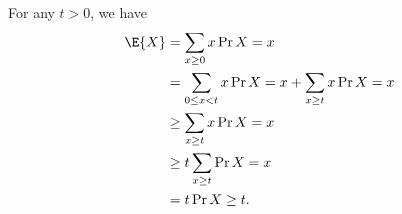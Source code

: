 For any $t>0$, we have
\begin{align*}
    \E{X} &= \sum_{x\ge0}x\Pr{X=x} \\
    &= \sum_{0\le x<t}x\Pr{X=x}+\sum_{x\ge t}x\Pr{X=x} \\
    &\ge \sum_{x\ge t}x\Pr{X=x} \\
    &\ge t\sum_{x\ge t}\Pr{X=x} \\
    &= t\Pr{X\ge t}.
\end{align*}

